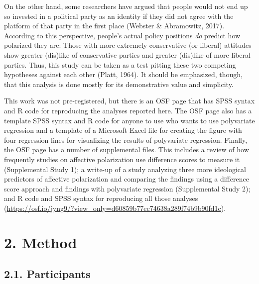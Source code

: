 \documentclass[authordate, meta]{jote-new-article}
\begin{document}
	On the other hand, some researchers have argued that people would not end up so invested in a political party as an identity if they did not agree with the platform of that party in the first place (Webster \& Abramowitz, 2017). According to this perspective, people's actual policy positions \emph{do }predict how polarized they are: Those with more extremely conservative (or liberal) attitudes show greater (dis)like of conservative parties and greater (dis)like of more liberal parties. Thus, this study can be taken as a test pitting these two competing hypotheses against each other (Platt, 1964). It should be emphasized, though, that this analysis is done mostly for its demonstrative value and simplicity.



	This work was not pre-registered, but there is an OSF page that has SPSS syntax and R code for reproducing the analyses reported here. The OSF page also has a template SPSS syntax and R code for anyone to use who wants to use polyvariate regression and a template of a Microsoft Excel file for creating the figure with four regression lines for visualizing the results of polyvariate regression. Finally, the OSF page has a number of supplemental files. This includes a review of how frequently studies on affective polarization use difference scores to measure it (Supplemental Study 1); a write-up of a study analyzing three more ideological predictors of affective polarization and comparing the findings using a difference score approach and findings with polyvariate regression (Supplemental Study 2); and R code and SPSS syntax for reproducing all those analyses (\url{https://osf.io/jyng9/?view_only=d60859b77ec74638a289f74b9b90fd1c}).











	\section{2. Method}



	\subsection{2.1. Participants}
\end{document}
